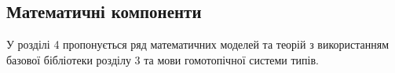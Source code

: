 \subsection*{Математичні компоненти}
У розділі 4 пропонується ряд математичних моделей та теорій з використанням
базової бібліотеки розділу 3 та мови гомотопічної системи типів.



